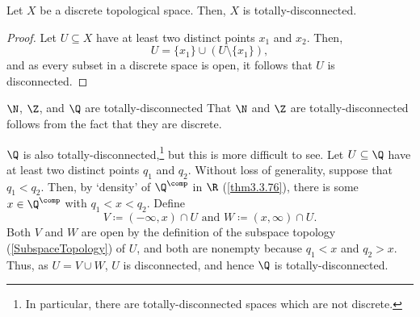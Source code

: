 \begin{prp}{}{}
Let $X$ be a discrete topological space.  Then, $X$ is totally-disconnected.
\begin{proof}
Let $U\subseteq X$ have at least two distinct points $x_1$ and $x_2$.  Then,
\begin{equation}
U=\{ x_1\} \cup (U\setminus \{ x_1\} ),
\end{equation}
and as every subset in a discrete space is open, it follows that $U$ is disconnected.
\end{proof}
\end{prp}
\begin{exm}{$\N$, $\Z$, and $\Q$ are totally-discon\-nected}{}
That $\N$ and $\Z$ are totally-disconnected follows from the fact that they are discrete.

$\Q$ is also totally-disconnected,\footnote{In particular, there are totally-disconnected spaces which are not discrete.} but this is more difficult to see.  Let $U\subseteq \Q$ have at least two distinct points $q_1$ and $q_2$.  Without loss of generality, suppose that $q_1<q_2$.  Then, by `density' of $\Q ^{\comp}$ in $\R$ (\cref{thm3.3.76}), there is some $x\in \Q ^{\comp}$ with $q_1<x<q_2$.  Define
\begin{equation}
V\coloneqq (-\infty ,x)\cap U \text{ and }W\coloneqq (x,\infty )\cap U .
\end{equation}
Both $V$ and $W$ are open by the definition of the subspace topology (\cref{SubspaceTopology}) of $U$, and both are nonempty because $q_1<x$ and $q_2>x$.  Thus, as $U=V\cup W$, $U$ is disconnected, and hence $\Q$ is totally-disconnected.
\end{exm}


